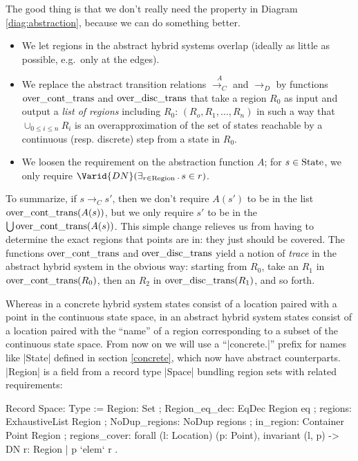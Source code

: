 \documentclass[runningheads]{llncs}
\newcommand{\Exists}[2]{\exists_{#1} \, . \, #2}
\newcommand{\State}{{\rm State}}
\newcommand{\Region}{{\rm Region}}
\newcommand{\contrans}{\rightarrow_C}
\newcommand{\distrans}{\rightarrow_D}
\newcommand{\acontrans}{\stackrel{A}{\rightarrow_C}}
\newcommand{\overcontrans}{{\rm over\_cont\_trans}}
\newcommand{\overdistrans}{{\rm over\_disc\_trans}}
\begin{document}
The good thing is that we don't really need the property in Diagram
\ref{diag:abstraction}, because we can do something better. 
\begin{itemize}
\item
We let regions in the abstract hybrid systems overlap (ideally as
little as possible, e.g.\ only at the edges).

\item
We replace the abstract transition relations $\acontrans$ and $\distrans$ by functions $\overcontrans$ and $\overdistrans$ that take a region $R_0$
as input and output a {\em list of regions\/} including $R_0$: $(R_o,
R_1, \ldots, R_n)$ in such a way that $\cup_{0\leq i\leq n}R_i$ is an
overapproximation of the set of states reachable by a continuous (resp. discrete) step
from a state in $R_0$.\\
\item
We loosen the requirement on the abstraction function $A$; for $s \in \State$, we only require $\Varid{DN}(\Exists {r\in \Region}{s\in r})$.
\end{itemize}

To summarize, if $s\contrans s'$, then we don't require
$A(s')$ to be in the list $\overcontrans(A(s))$, but we only require
$s'$ to be in the $\bigcup \overcontrans(A(s))$. 
This simple change relieves us from having to determine the exact
regions that points are in: they just should be covered. The functions
$\overcontrans$ and $\overdistrans$ yield a notion of {\em trace\/} in
the abstract hybrid system in the obvious way: starting from $R_0$,
take an $R_1$ in $\overcontrans( R_0)$, then an $R_2$ in
$\overdistrans(R_1)$, and so forth.

Whereas in a concrete hybrid system states consist of a location
paired with a point in the continuous state space, in an abstract
hybrid system states consist of a location paired with the ``name'' of
a region corresponding to a subset of the continuous state space.
From now on we will use a ``|concrete.|'' prefix for names like
|State| defined in section \ref{concrete}, which now have abstract
counterparts. |Region| is a field from a record type |Space| bundling
region sets with related requirements:

\begin{code}
  Record Space: Type :=
    { Region: Set
    ; Region_eq_dec: EqDec Region eq
    ; regions: ExhaustiveList Region
    ; NoDup_regions: NoDup regions
    ; in_region: Container Point Region
    ; regions_cover: forall (l: Location) (p: Point),
        invariant (l, p) -> DN { r: Region | p `elem` r }  }.
\end{code}
\end{document}
